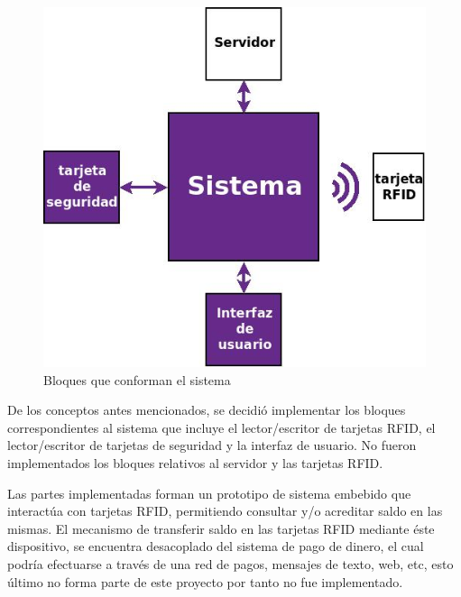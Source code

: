 \documentclass[%
        final,
        notitlepage,
        narroweqnarray,
        inline,
        ]{ieee}
\begin{document}
\begin{figure}[h]
\centering
  \begin{center}
  	\includegraphics[scale=.3]{../pres_fin/Imagenes/diagrama_def.jpg} 
  	\caption{Bloques que conforman el sistema}\label{sist_gral} 
  \end{center}		 
\end{figure}

De los conceptos antes mencionados, se decidió implementar los bloques correspondientes al 
sistema que incluye el lector/escritor de tarjetas RFID, el lector/escritor de tarjetas 
de seguridad y la interfaz de usuario.
No fueron implementados los bloques relativos al servidor y las tarjetas RFID.


Las partes implementadas forman un prototipo de sistema embebido que interactúa con tarjetas RFID,
permitiendo consultar y/o acreditar saldo en las mismas.
El mecanismo de transferir saldo en las tarjetas RFID mediante éste dispositivo, se encuentra
desacoplado del sistema de pago de dinero, el cual podría efectuarse a través de una red de pagos,
mensajes de texto, web, etc, esto último no forma parte de este proyecto por tanto no fue implementado.



\end{document}
